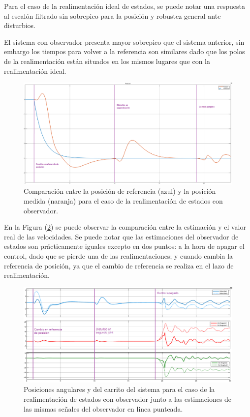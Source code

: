 Para el caso de la realimentación ideal de estados, se puede notar una respuesta al escalón filtrado sin sobrepico para la posición y robustez general ante disturbios. 


El sistema con observador presenta mayor sobrepico que el sistema anterior, sin embargo los tiempos para volver a la referencia son similares dado que los polos de la realimentación están situados en los mismos lugares que con la realimentación ideal.

\begin{figure}[H]
	\centering
	\includegraphics[width=\linewidth]{../Analisis de Resultados/ImagenesAnalisis de Resultados/obsv_posref.png}
	\caption{Comparación entre la posición de referencia (azul) y la posición medida (naranja) para el caso de la realimentación de estados con observador.}	
	\label{fig:obsv_posref}
\end{figure}

En la Figura (\ref{fig:obsv_vars}) se puede observar la comparación entre la estimación  y el valor real de las velocidades. Se puede notar que las estimaciones del observador de estados son prácticamente iguales excepto en dos puntos: a la hora de apagar el control, dado que se pierde una de las realimentaciones;  y cuando cambia la referencia de posición, ya que el cambio de referencia se realiza en el lazo de realimentación.

\begin{figure}[H]
	\centering
	\includegraphics[width=\linewidth]{../Analisis de Resultados/ImagenesAnalisis de Resultados/obsv_vars.png}
	\caption{Posiciones angulares y del carrito del sistema para el caso de la realimentación de estados con observador junto a las estimaciones de las mismas señales del observador en linea punteada.}	
	\label{fig:obsv_vars}
\end{figure}

